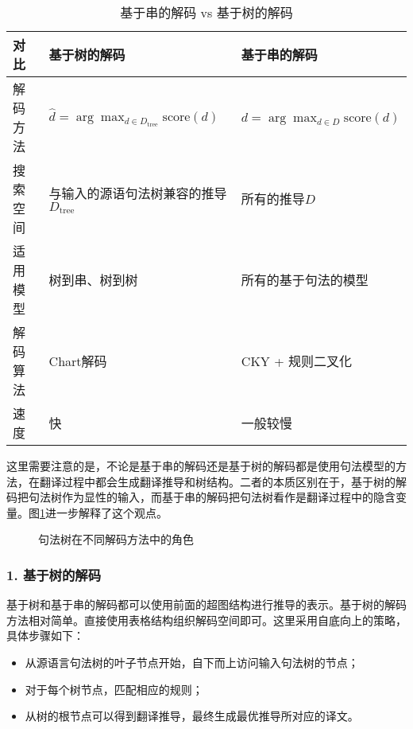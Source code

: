 \begin{table}[htp]{
\begin{center}
\caption{基于串的解码 vs 基于树的解码}
\label{tab:8-4}
{
\begin{tabular}{l | p{16.5em} p{12em}}
对比 & 基于树的解码 & 基于串的解码 \\
\hline
\rule{0pt}{15pt}解码方法 & $\hat{d} = \arg\max_{d \in D_{\textrm{tree}}} \textrm{score} (d)$ & $\hat{d} = \arg\max_{d \in D} \textrm{score} (d)$ \\
\rule{0pt}{15pt}搜索空间 & 与输入的源语句法树兼容的推导$D_{\textrm{tree}}$ & 所有的推导$D$ \\
\rule{0pt}{15pt}适用模型 & 树到串、树到树 & 所有的基于句法的模型 \\
\rule{0pt}{15pt}解码算法 & Chart解码 & CKY + 规则二叉化 \\
\rule{0pt}{15pt}速度 & 快 & 一般较慢
\end{tabular}
}
\end{center}
}\end{table}

\parinterval 这里需要注意的是，不论是基于串的解码还是基于树的解码都是使用句法模型的方法，在翻译过程中都会生成翻译推导和树结构。二者的本质区别在于，基于树的解码把句法树作为显性的输入，而基于串的解码把句法树看作是翻译过程中的隐含变量。图\ref{fig:8-40}进一步解释了这个观点。

\begin{figure}[htp]
\centering

\caption{句法树在不同解码方法中的角色}
\label{fig:8-40}
\end{figure}


\subsubsection{1. 基于树的解码}

\parinterval 基于树和基于串的解码都可以使用前面的超图结构进行推导的表示。基于树的解码方法相对简单。直接使用表格结构组织解码空间即可。这里采用自底向上的策略，具体步骤如下：
\begin{itemize}
\vspace{0.5em}
\item 从源语言句法树的叶子节点开始，自下而上访问输入句法树的节点；
\vspace{0.5em}
\item 对于每个树节点，匹配相应的规则；
\vspace{0.5em}
\item 从树的根节点可以得到翻译推导，最终生成最优推导所对应的译文。
\vspace{0.5em}
\end{itemize}

